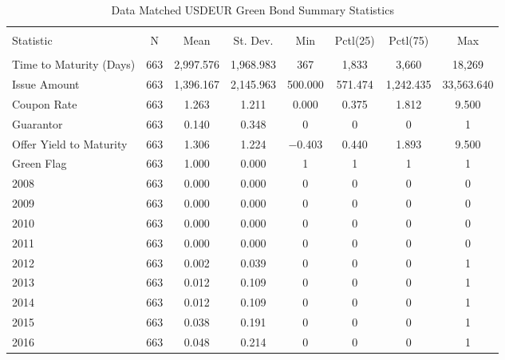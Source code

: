 \begin{table}[!h] \centering 
  \footnotesize
  \caption{Data Matched USDEUR Green Bond Summary Statistics} 
  \label{desc3} 
\begin{tabular}{@{\extracolsep{5pt}}lccccccc} 
\\[-1.8ex]\hline 
\hline \\[-1.8ex] 
Statistic & \multicolumn{1}{c}{N} & \multicolumn{1}{c}{Mean} & \multicolumn{1}{c}{St. Dev.} & \multicolumn{1}{c}{Min} & \multicolumn{1}{c}{Pctl(25)} & \multicolumn{1}{c}{Pctl(75)} & \multicolumn{1}{c}{Max} \\ 
\hline \\[-1.8ex] 
Time to Maturity (Days) & 663 & 2,997.576 & 1,968.983 & 367 & 1,833 & 3,660 & 18,269 \\ 
Issue Amount & 663 & 1,396.167 & 2,145.963 & 500.000 & 571.474 & 1,242.435 & 33,563.640 \\ 
Coupon Rate & 663 & 1.263 & 1.211 & 0.000 & 0.375 & 1.812 & 9.500 \\ 
Guarantor & 663 & 0.140 & 0.348 & 0 & 0 & 0 & 1 \\ 
Offer Yield to Maturity & 663 & 1.306 & 1.224 & $-$0.403 & 0.440 & 1.893 & 9.500 \\ 
Green Flag & 663 & 1.000 & 0.000 & 1 & 1 & 1 & 1 \\ 
2008 & 663 & 0.000 & 0.000 & 0 & 0 & 0 & 0 \\ 
2009 & 663 & 0.000 & 0.000 & 0 & 0 & 0 & 0 \\ 
2010 & 663 & 0.000 & 0.000 & 0 & 0 & 0 & 0 \\ 
2011 & 663 & 0.000 & 0.000 & 0 & 0 & 0 & 0 \\ 
2012 & 663 & 0.002 & 0.039 & 0 & 0 & 0 & 1 \\ 
2013 & 663 & 0.012 & 0.109 & 0 & 0 & 0 & 1 \\ 
2014 & 663 & 0.012 & 0.109 & 0 & 0 & 0 & 1 \\ 
2015 & 663 & 0.038 & 0.191 & 0 & 0 & 0 & 1 \\ 
2016 & 663 & 0.048 & 0.214 & 0 & 0 & 0 & 1 \\ 

\end{tabular}
\end{table}
